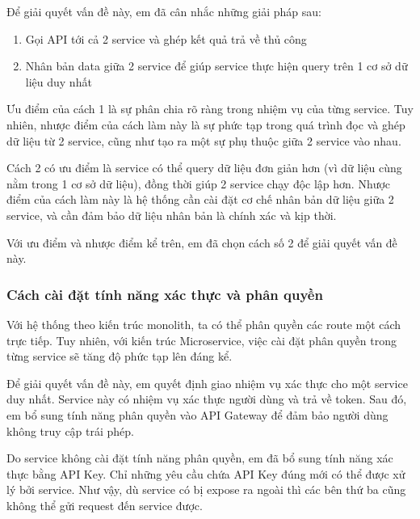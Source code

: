 \documentclass[./../main.tex]{subfiles}
\begin{document}
Để giải quyết vấn đề này, em đã cân nhắc những giải pháp sau:

\begin{enumerate}
\def\labelenumi{\arabic{enumi}.}
\item
  
  Gọi API tới cả 2 service và ghép kết quả trả về thủ công
  
\item
  
  Nhân bản data giữa 2 service để giúp service thực hiện query trên 1 cơ
  sở dữ liệu duy nhất
  
\end{enumerate}

Ưu điểm của cách 1 là sự phân chia rõ ràng trong nhiệm vụ của từng
service. Tuy nhiên, nhược điểm của cách làm này là sự phức tạp trong quá
trình đọc và ghép dữ liệu từ 2 service, cũng như tạo ra một sự phụ thuộc
giữa 2 service vào nhau.

Cách 2 có ưu điểm là service có thể query dữ liệu đơn giản hơn (vì dữ
liệu cùng nằm trong 1 cơ sở dữ liệu), đồng thời giúp 2 service chạy độc
lập hơn. Nhược điểm của cách làm này là hệ thống cần cài đặt cơ chế nhân
bản dữ liệu giữa 2 service, và cần đảm bảo dữ liệu nhân bản là chính xác
và kịp thời.

Với ưu điểm và nhược điểm kể trên, em đã chọn cách số 2 để giải quyết
vấn đề này.

\hypertarget{cuxe1ch-cuxe0i-ux111ux1eb7t-tuxednh-nux103ng-xuxe1c-thux1ef1c-vuxe0-phuxe2n-quyux1ec1n}{%
\subsubsection{Cách cài đặt tính năng xác thực và phân
quyền}\label{cuxe1ch-cuxe0i-ux111ux1eb7t-tuxednh-nux103ng-xuxe1c-thux1ef1c-vuxe0-phuxe2n-quyux1ec1n}}

Với hệ thống theo kiến trúc monolith, ta có thể phân quyền các route một
cách trực tiếp. Tuy nhiên, với kiến trúc Microservice, việc cài đặt phân
quyền trong từng service sẽ tăng độ phức tạp lên đáng kể.

Để giải quyết vấn đề này, em quyết định giao nhiệm vụ xác thực cho một
service duy nhất. Service này có nhiệm vụ xác thực người dùng và trả về
token. Sau đó, em bổ sung tính năng phân quyền vào API Gateway để đảm
bảo người dùng không truy cập trái phép.

Do service không cài đặt tính năng phân quyền, em đã bổ sung tính năng
xác thực bằng API Key. Chỉ những yêu cầu chứa API Key đúng mới có thể
được xử lý bởi service. Như vậy, dù service có bị expose ra ngoài thì
các bên thứ ba cũng không thể gửi request đến service được.
\end{document}
